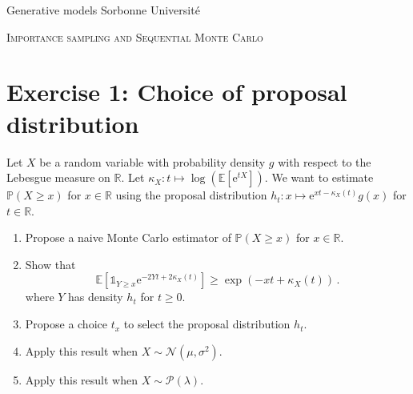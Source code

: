 \documentclass[a4paper,10pt,fleqn]{article}
\newcommand{\rset}{\ensuremath{\mathbb{R}}}
\newcommand{\1}{\ensuremath{\mathbbm{1}}}
\begin{document}
\noindent Generative models \hfill Sorbonne Universit\'e 

\noindent\hrulefill

\begin{center}
\textsc{Importance sampling and Sequential Monte Carlo}
\end{center}
\hrulefill

\section*{Exercise 1: Choice of proposal distribution}
Let $X$ be a random variable with probability density $g$ with respect to the Lebesgue measure on $\rset$. Let $\kappa_X:t\mapsto \log(\mathbb{E}[\mathrm{e}^{tX}])$. We want to estimate $\mathbb{P}(X\geq x)$ for $x\in\rset$ using the proposal distribution $h_t:x\mapsto \mathrm{e}^{xt-\kappa_X(t)}g(x)$ for $t\in\rset$.
\begin{enumerate}
\item Propose a naive Monte Carlo estimator of $\mathbb{P}(X\geq x)$ for $x\in\rset$.
\item Show that 
$$
\mathbb{E}\left[\mathds{1}_{Y\geq x}\mathrm{e}^{-2Yt +2\kappa_X(t)}\right] \geq \exp(-xt+\kappa_X(t))\,.
$$
where $Y$ has density $h_t$ for $t\geq 0$.
\item Propose a choice $t_x$ to select the proposal distribution $h_t$.
\item Apply this result when $X\sim\mathcal{N}(\mu,\sigma^2)$.
\item Apply this result when $X\sim\mathcal{P}(\lambda)$.
\end{enumerate}
\end{document}
